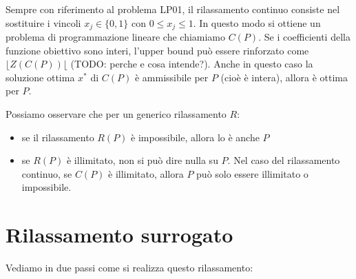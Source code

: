\documentclass[11pt]{book}
\begin{document}
Sempre con riferimento al problema LP01, il rilassamento continuo
consiste nel sostituire i vincoli $x_j \in \{0,1\}$ con $0 \leq x_j
\leq 1$. In questo modo si ottiene un problema di programmazione
lineare che chiamiamo $C(P)$. Se i coefficienti della funzione
obiettivo sono interi, l'upper bound pu\`o essere rinforzato come
$\lfloor Z(C(P))\lfloor$ (TODO: perche e cosa intende?). Anche in
questo caso la soluzione ottima $x^*$ di $C(P)$ \`e ammissibile per $P$
(cio\`e \`e intera), allora \`e ottima per $P$.

Possiamo osservare che per un generico rilassamento $R$:
\begin{itemize}
\item se il rilassamento $R(P)$ \`e impossibile, allora lo \`e anche $P$
\item se $R(P)$ \`e illimitato, non si pu\`o dire nulla su $P$. Nel caso
  del rilassamento continuo, se $C(P)$ \`e illimitato, allora $P$ pu\`o
  solo essere illimitato o impossibile.
\end{itemize}

\section{Rilassamento surrogato}

Vediamo in due passi come si realizza questo rilassamento:
\end{document}
